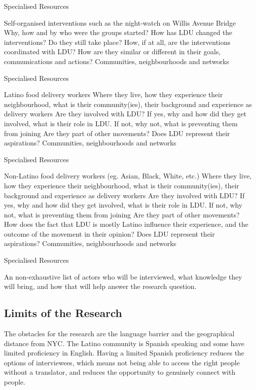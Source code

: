 \documentclass{article}
\begin{document}
Specialised Resources


Self-organised interventions such as the night-watch on Willis Avenue Bridge
Why, how and by who were the groups started?
How has LDU changed the interventions? Do they still take place? How, if at all, are the interventions coordinated with LDU? How are they similar or different in their goals, communications and actions?
Communities, neighbourhoods and networks

Specialised Resources


Latino food delivery workers
Where they live, how they experience their neighbourhood, what is their community(ies), their background and experience as delivery workers
Are they involved with LDU? If yes, why and how did they get involved, what is their role in LDU. If not, why not, what is preventing them from joining
Are they part of other movements?
Does LDU represent their aspirations?
Communities, neighbourhoods and networks

Specialised Resources


Non-Latino food delivery workers (eg. Asian, Black, White, etc.)
Where they live, how they experience their neighbourhood, what is their community(ies), their background and experience as delivery workers
Are they involved with LDU? If yes, why and how did they get involved, what is their role in LDU. If not, why not, what is preventing them from joining
Are they part of other movements?
How does the fact that LDU is mostly Latino influence their experience, and the outcome of the movement in their opinion?
Does LDU represent their aspirations?
Communities, neighbourhoods and networks

Specialised Resources



An non-exhaustive list of actors who will be interviewed, what knowledge they will bring, and how that will help answer the research question.


\subsection{Limits of the Research}

The obstacles for the research are the language barrier and the geographical distance from NYC. The Latino community is Spanish speaking and some have limited proficiency in English. Having a limited Spanish proficiency reduces the options of interviewees, which means not being able to access the right people without a translator, and reduces the opportunity to genuinely connect with people.
\end{document}
